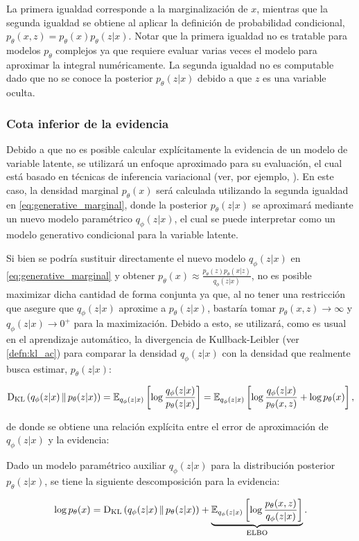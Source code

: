 La primera igualdad corresponde a la marginalización de $x$, mientras que la segunda igualdad se obtiene al aplicar la definición de probabilidad condicional, $p_\theta(x,z)=p_\theta(x)p_\theta(z|x)$. Notar que la primera igualdad no es tratable para modelos $p_\theta$ complejos ya que requiere evaluar varias veces el modelo para aproximar la integral numéricamente. La segunda igualdad no es computable dado que no se conoce la posterior $p_\theta(z|x)$ debido a que $z$ es una variable oculta.

\subsubsection{Cota inferior de la evidencia}

Debido a que no es posible calcular explícitamente la evidencia de un modelo de variable latente, se utilizará un enfoque aproximado para su evaluación, el cual está basado en técnicas de inferencia variacional (ver, por ejemplo, \cite{Blei_2017}). En este caso, la densidad marginal $p_\theta(x)$ será calculada utilizando la segunda igualdad en \eqref{eq:generative_marginal}, donde la posterior $p_\theta(z|x)$ se aproximará mediante un nuevo modelo paramétrico $q_\phi(z|x)$, el cual se puede interpretar como un modelo generativo condicional para la variable latente.

Si bien se podría sustituir directamente el nuevo modelo $q_\phi(z|x)$ en \eqref{eq:generative_marginal} y obtener $p_\theta(x)\approx\frac{p_\theta(z)p_\theta(x|z)}{q_\phi(z|x)}$, no es posible maximizar dicha cantidad de forma conjunta ya que, al no tener una restricción que asegure que $q_\phi(z|x)$ aproxime a $p_\theta(z|x)$, bastaría tomar $p_\theta(x,z)\to\infty$ y $q_\phi(z|x)\to 0^+$ para la maximización. Debido a esto, se utilizará, como es usual en el aprendizaje automático, la divergencia de Kullback-Leibler (ver \autoref{defn:kl_ac}) para comparar la densidad $q_\phi(z|x)$ con la densidad que realmente busca estimar, $p_\theta(z|x)$:

\begin{equation*}
    \operatorname{D_{KL}}\left(q_\phi(z|x)\,\|\,p_\theta(z|x)\right)
    = \mathbb{E}_{q_\phi(z|x)}\left[\log\frac{q_\phi(z|x)}{p_\theta(z|x)}\right]
    = \mathbb{E}_{q_\phi(z|x)}\left[\log\frac{q_\phi(z|x)}{p_\theta(x,z)} + \log p_\theta(x)\right],
\end{equation*}

de donde se obtiene una relación explícita entre el error de aproximación de $q_\phi(z|x)$ y la evidencia:

\begin{prop}
    Dado un modelo paramétrico auxiliar $q_\phi(z|x)$ para la distribución posterior $p_\theta(z|x)$, se tiene la siguiente descomposición para la evidencia:

    \begin{equation}
        \label{eq:evidence_decomposition}
        \log p_\theta(x)
        = \operatorname{D_{KL}}\left(q_\phi(z|x)\,\|\,p_\theta(z|x)\right) + \underbrace{\mathbb{E}_{q_\phi(z|x)}\left[\log\frac{p_\theta(x,z)}{q_\phi(z|x)}\right]}_{\operatorname{ELBO}}.
    \end{equation}
\end{prop}

